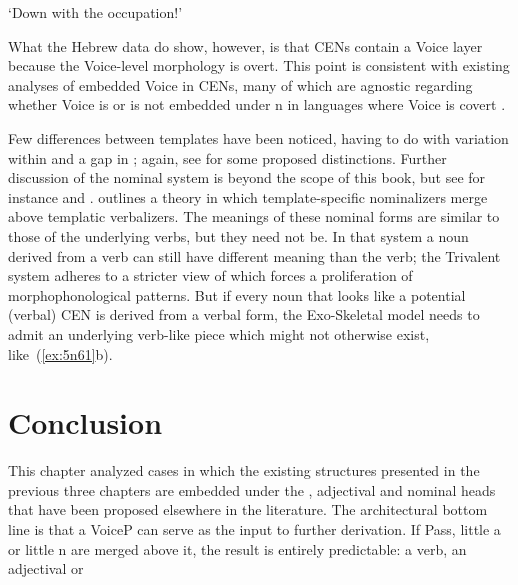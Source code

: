 \begin{exe}
\begin{xlist}
\begin{exe}
\begin{xlist}
\begin{exe}
\begin{exe}
\begin{xlist}
\begin{exe}
\begin{exe}
\begin{xlist}
\begin{exe}
\begin{xlist}
\begin{exe}
\begin{xlist}
\begin{exe}
\begin{xlist}
\begin{xlist}
\begin{exe}
\begin{xlist}
\begin{exe}
\begin{xlist}
\begin{exe}
\begin{exe}
\begin{exe}
\begin{xlist}
\begin{exe}
\begin{exe}
\begin{xlist}
\begin{exe}
\begin{xlist}
\begin{exe}
\begin{xlist}
\begin{exe}
\begin{xlist}
\begin{xlist}
\begin{exe}
\begin{xlist}
\begin{exe}
\begin{xlist}
\begin{exe}
\begin{xlist}
\begin{exe}
\begin{xlist}
\begin{exe}
\begin{exe}
\begin{exe}
\begin{exe}
\begin{exe}
\begin{xlist}
\begin{xlist}
\begin{exe}
\begin{xlist}
\begin{exe}
\begin{xlist}
\begin{exe}
\begin{exe}
\begin{exe}
\begin{xlist}
\begin{exe}
\begin{xlist}
\begin{exe}
\begin{xlist}
\begin{exe}
\begin{exe}
\begin{xlist}
\begin{exe}
\begin{exe}
\begin{exe}
\begin{xlist}
\begin{xlist}
\begin{exe}
\begin{exe}
\begin{exe}
\begin{xlist}
\begin{exe}
\begin{xlist}
{`Down with the occupation!' } 
		
 \z
\z 

What the Hebrew data do show, however, is that CENs contain a Voice layer because the Voice-level morphology is overt. This point is consistent with existing analyses of embedded Voice in CENs, many of which are agnostic regarding whether Voice is or is not embedded under n in languages where Voice is covert \citep{alexiadou17,wood19lsa}.

Few differences between templates have been noticed, having to do with variation within {\tkal} \citep{borer13oup} and a gap in {\tnif} \citep{silonipreminger09,ahdoutkastner19nels}; again, see \cite{ahdout19glow,ahdout19phd} for some proposed distinctions. Further discussion of the nominal system is beyond the scope of this book, but see for instance \cite{fausthever10} and \cite{laks15ws}. \citet[534fn13, 555]{borer13oup} outlines a theory in which template-specific nominalizers merge above templatic verbalizers. The meanings of these nominal forms are similar to those of the underlying verbs, but they need not be. In that system a noun derived from a verb can still have different meaning than the verb; the Trivalent system adheres to a stricter view of  which forces a proliferation of morphophonological patterns. But if every noun that looks like a potential (verbal) CEN is derived from a verbal form, the Exo-Skeletal model needs to admit an underlying verb-like piece which might not otherwise exist, like~(\ref{ex:5n61}b).


\section{Conclusion} \label{passn:conc}
This chapter analyzed cases in which the existing structures presented in the previous three chapters are embedded under the , adjectival and nominal heads that have been proposed elsewhere in the literature. The architectural bottom line is that a VoiceP can serve as the input to further derivation. If Pass, little a or little n are merged above it, the result is entirely predictable: a  verb, an adjectival  or 
\end{xlist}
\end{exe}
\end{xlist}
\end{exe}
\end{exe}
\end{exe}
\end{xlist}
\end{xlist}
\end{exe}
\end{exe}
\end{exe}
\end{xlist}
\end{exe}
\end{exe}
\end{xlist}
\end{exe}
\end{xlist}
\end{exe}
\end{xlist}
\end{exe}
\end{exe}
\end{exe}
\end{xlist}
\end{exe}
\end{xlist}
\end{exe}
\end{xlist}
\end{xlist}
\end{exe}
\end{exe}
\end{exe}
\end{exe}
\end{exe}
\end{xlist}
\end{exe}
\end{xlist}
\end{exe}
\end{xlist}
\end{exe}
\end{xlist}
\end{exe}
\end{xlist}
\end{xlist}
\end{exe}
\end{xlist}
\end{exe}
\end{xlist}
\end{exe}
\end{xlist}
\end{exe}
\end{exe}
\end{xlist}
\end{exe}
\end{exe}
\end{exe}
\end{xlist}
\end{exe}
\end{xlist}
\end{exe}
\end{xlist}
\end{xlist}
\end{exe}
\end{xlist}
\end{exe}
\end{xlist}
\end{exe}
\end{xlist}
\end{exe}
\end{exe}
\end{xlist}
\end{exe}
\end{exe}
\end{xlist}
\end{exe}
\end{xlist}
\end{exe}
